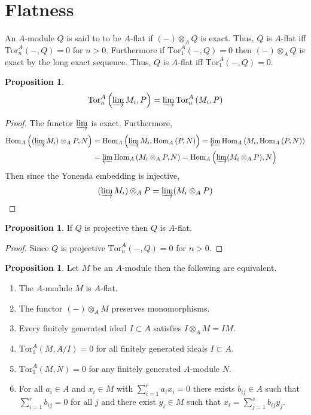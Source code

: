 \documentclass[12pt]{article}
\newcommand{\Tor}[4]{\mathrm{Tor}^{#1}_{#2} \left( #3, #4 \right)}
\newcommand{\Homover}[3]{\mathrm{Hom}_{#1} \left( #2, #3 \right)}
\theoremstyle{remark}
\theoremstyle{definition}
\newtheorem{proposition}[theorem]{Proposition}
\newenvironment{definition}[1][Definition:]{\begin{trivlist}
\item[\hskip \labelsep {\bfseries #1}]}{\end{trivlist}}
\begin{document}
\section{Flatness}

\begin{definition}
An $A$-module $Q$ is said to to be $A$-flat if $(-) \otimes_A Q$ is exact. Thus, $Q$ is $A$-flat iff $\Tor{A}{n}{-}{Q} = 0$ for $n > 0$. Furthermore if $\Tor{A}{1}{-}{Q} = 0$ then $(-) \otimes_A Q$ is exact by the long exact sequence. Thus, $Q$ is $A$-flat iff $\Tor{A}{1}{-}{Q} = 0$.   
\end{definition}

\begin{proposition}
\[ \Tor{A}{n}{\varinjlim M_i}{P} = \varinjlim \Tor{A}{n}{M_i}{P} \]
\end{proposition}

\begin{proof}
The functor $\varinjlim$ is exact. Furthermore, 
\begin{align*}
\Homover{A}{(\varinjlim M_i) \otimes_A P}{N} & = \Homover{A}{\varinjlim M_i}{\Homover{A}{P}{N}} = \varprojlim \Homover{A}{M_i}{\Homover{A}{P}{N}} 
\\
& = \varprojlim \Homover{A}{M_i \otimes_A P}{N} = \Homover{A}{\varinjlim (M_i \otimes_A P)}{N}
\end{align*} 
Then since the Yonenda embedding is injective,
\[ (\varinjlim M_i) \otimes_A P = \varinjlim (M_i \otimes_A P) \]
\end{proof}

\begin{proposition}
If $Q$ is projective then $Q$ is $A$-flat. 
\end{proposition}

\begin{proof}
Since $Q$ is projective $\Tor{A}{n}{-}{Q} = 0$ for $n > 0$. 
\end{proof}

\begin{proposition}
Let $M$ be an $A$-module then the following are equivalent.
\begin{enumerate}
\item The $A$-module $M$ is $A$-flat.

\item The functor $(-) \otimes_A M$ preserves monomorphisms.

\item Every finitely generated ideal $I \subset A$ satisfies $I \otimes_A M = I M$. 

\item $\Tor{A}{1}{M}{A/I} = 0$ for all finitely generated ideals $I \subset A$. 

\item $\Tor{A}{1}{M}{N} = 0$ for any finitely generated $A$-module $N$.

\item For all $a_i \in A$ and $x_i \in M$ with $\sum_{i = 1}^r a_i x_i = 0$ there exists $b_{ij} \in A$ such that $\sum_{i = 1}^r b_{ij} = 0$ for all $j$ and there exist $y_i \in M$ such that $x_i = \sum_{j = 1}^s b_{ij} y_j$. 
\end{enumerate}
\end{proposition}
\end{document}
